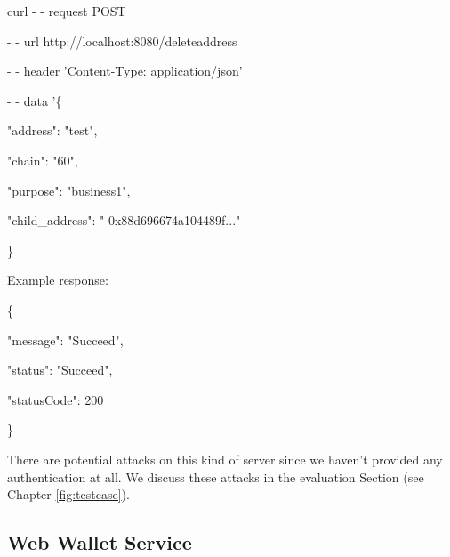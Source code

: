 \begin{framed}
\hspace*{13mm}    curl - - request POST \par
\hspace*{13mm}        - - url http://localhost:8080/deleteaddress \par
\hspace*{13mm}        - - header 'Content-Type: application/json' \par
\hspace*{13mm}        - - data '\{ \par
\hspace*{27mm}                "address": "test",  \par
\hspace*{40mm}                "chain": "60", \par
\hspace*{40mm}                "purpose": "business1", \par
\hspace*{40mm}                "child\_address": " 0x88d696674a104489f..." \par
\hspace*{27mm}              \} \par
\end{framed}

Example response:

\begin{framed}
    \hspace*{13mm}        \{ \par
    \hspace*{13mm}                "message": "Succeed",    \par
    \hspace*{13mm}                "status": "Succeed",    \par
    \hspace*{13mm}             "statusCode": 200    \par
    \hspace*{13mm}                 \}    \par
\end{framed}

There are potential attacks on this kind of server since we haven’t provided any authentication at all. We discuss these attacks in the evaluation Section (see Chapter \ref{fig:testcase}).

\subsection{Web Wallet Service}
\label{webui}

